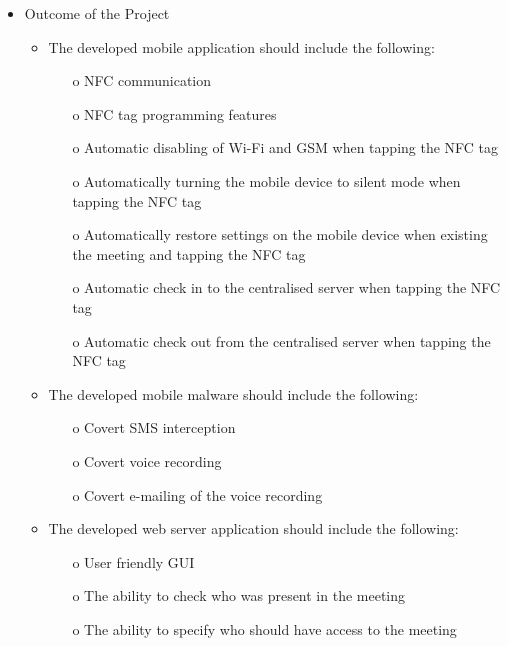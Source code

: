 \begin{itemize}
	\item Outcome of the Project
	\begin{itemize}
		\item The developed mobile application should include the following:
		\begin{itemize}
			\item [o] NFC communication
			\item [o] NFC tag programming features
			\item [o] Automatic disabling of Wi-Fi and GSM when tapping the NFC tag
			\item [o] Automatically turning the mobile device to silent mode when tapping the NFC tag
			\item [o] Automatically restore settings on the mobile device when existing the meeting and tapping the NFC tag
			\item [o] Automatic check in to the centralised server when tapping the NFC tag
			\item [o] Automatic check out from the centralised server when tapping the NFC tag
		\end{itemize}
		\item The developed mobile malware should include the following:
		\begin{itemize}
			\item [o] Covert SMS interception
			\item [o] Covert voice recording
			\item [o] Covert e-mailing of the voice recording
		\end{itemize}
		\item The developed web server application should include the following:
		\begin{itemize}
			\item [o] User friendly GUI
			\item [o] The ability to check who was present in the meeting
			\item [o] The ability to specify who should have access to the meeting
		\end{itemize}
	\end{itemize}
	
\end{itemize}
